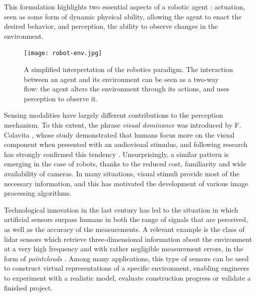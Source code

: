 This formulation highlights two essential aspects of a robotic agent : actuation, seen as some form of dynamic physical ability, allowing the agent to enact the desired behavior, and perception, the ability to observe changes in the environment.


\begin{figure}[H]
    \centering
    \texttt{[image: robot-env.jpg]}
    \caption[Perception in the Robot-Environment exchange]{A simplified interpretation of the robotics paradigm. The interaction between an agent and its environment can be seen as a two-way flow: the agent alters the environment through its actions, and uses perception to observe it.}
    \label{fig:robot-env}
\end{figure}


Sensing modalities have largely different contributions to the perception mechanism. To this extent, the phrase \emph{visual dominance} was introduced by F. Colavita \cite{colavita1974human}, whose study demonstrated that humans focus more on the visual component when presented with an audiovisual stimulus, and following research has strongly confirmed this tendency \cite{Hutmacher2019,hecht2009sensory}. Unsurprisingly, a similar pattern is emerging in the case of robots, thanks to the reduced cost, familiarity and wide availability of cameras. In many situations, visual stimuli provide most of the necessary information, and this has motivated the development of various image processing algorithms.

Technological innovation in the last century has led to the situation in which artificial sensors surpass humans in both the range of signals that are perceived, as well as the accuracy of the measurements. A relevant example is the class of \acrfull{lidar} sensors which retrieve three-dimensional information about the environment at a very high frequency and with rather negligible measurement errors, in the form of \emph{\glspl{pointcloud}} . Among many applications, this type of sensors can be used to construct virtual representations of a specific environment, enabling engineers to experiment with a realistic model, evaluate construction progress or validate a finished project.

